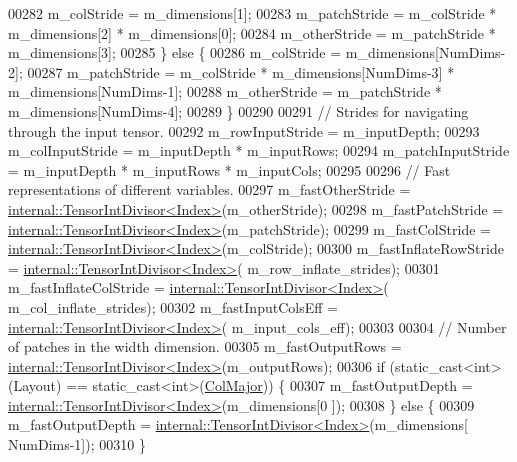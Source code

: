 \begin{DoxyCode}
00282       m\_colStride = m\_dimensions[1];
00283       m\_patchStride = m\_colStride * m\_dimensions[2] * m\_dimensions[0];
00284       m\_otherStride = m\_patchStride * m\_dimensions[3];
00285     \} \textcolor{keywordflow}{else} \{
00286       m\_colStride = m\_dimensions[NumDims-2];
00287       m\_patchStride = m\_colStride * m\_dimensions[NumDims-3] * m\_dimensions[NumDims-1];
00288       m\_otherStride = m\_patchStride * m\_dimensions[NumDims-4];
00289     \}
00290 
00291     \textcolor{comment}{// Strides for navigating through the input tensor.}
00292     m\_rowInputStride = m\_inputDepth;
00293     m\_colInputStride = m\_inputDepth * m\_inputRows;
00294     m\_patchInputStride = m\_inputDepth * m\_inputRows * m\_inputCols;
00295 
00296     \textcolor{comment}{// Fast representations of different variables.}
00297     m\_fastOtherStride = \hyperlink{struct_eigen_1_1internal_1_1_tensor_int_divisor}{internal::TensorIntDivisor<Index>}(m\_otherStride);
00298     m\_fastPatchStride = \hyperlink{struct_eigen_1_1internal_1_1_tensor_int_divisor}{internal::TensorIntDivisor<Index>}(m\_patchStride);
00299     m\_fastColStride = \hyperlink{struct_eigen_1_1internal_1_1_tensor_int_divisor}{internal::TensorIntDivisor<Index>}(m\_colStride);
00300     m\_fastInflateRowStride = \hyperlink{struct_eigen_1_1internal_1_1_tensor_int_divisor}{internal::TensorIntDivisor<Index>}(
      m\_row\_inflate\_strides);
00301     m\_fastInflateColStride = \hyperlink{struct_eigen_1_1internal_1_1_tensor_int_divisor}{internal::TensorIntDivisor<Index>}(
      m\_col\_inflate\_strides);
00302     m\_fastInputColsEff = \hyperlink{struct_eigen_1_1internal_1_1_tensor_int_divisor}{internal::TensorIntDivisor<Index>}(
      m\_input\_cols\_eff);
00303 
00304     \textcolor{comment}{// Number of patches in the width dimension.}
00305     m\_fastOutputRows = \hyperlink{struct_eigen_1_1internal_1_1_tensor_int_divisor}{internal::TensorIntDivisor<Index>}(m\_outputRows);
00306     \textcolor{keywordflow}{if} (static\_cast<int>(Layout) == \textcolor{keyword}{static\_cast<}\textcolor{keywordtype}{int}\textcolor{keyword}{>}(\hyperlink{group__enums_ggaacded1a18ae58b0f554751f6cdf9eb13a0cbd4bdd0abcfc0224c5fcb5e4f6669a}{ColMajor})) \{
00307       m\_fastOutputDepth = \hyperlink{struct_eigen_1_1internal_1_1_tensor_int_divisor}{internal::TensorIntDivisor<Index>}(m\_dimensions[0
      ]);
00308     \} \textcolor{keywordflow}{else} \{
00309       m\_fastOutputDepth = \hyperlink{struct_eigen_1_1internal_1_1_tensor_int_divisor}{internal::TensorIntDivisor<Index>}(m\_dimensions[
      NumDims-1]);
00310     \}

\end{DoxyCode}
